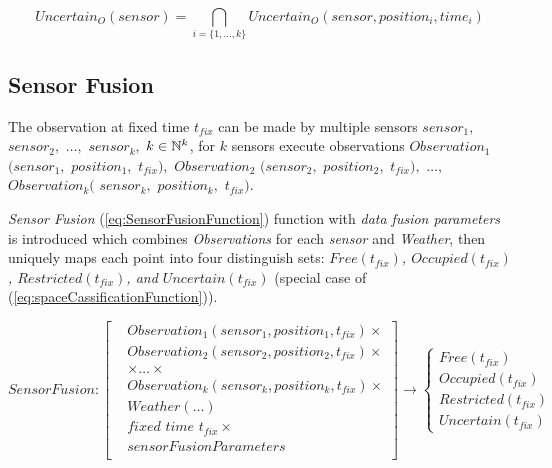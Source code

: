    \begin{equation}\label{eq:uncertainObservableSpaceForOneSensor}
         Uncertain_O(sensor)= \bigcap_{i=\{1,\dots,k\}}Uncertain_O(sensor,position_i,time_i)
    \end{equation}

\subsection{Sensor Fusion}\label{s:SensorFusionDefinition}
    \noindent The observation at fixed time $t_{fix}$ can be made by multiple sensors $sensor_1,$ $sensor_2,$ $\dots,$ $sensor_k,$ $k\in\mathbb{N}^k$, for $k$ sensors execute observations $Observation_1$ $(sensor_1,$ $position_1,$ $t_{fix}),$ $Observation_2$ $(sensor_2,$ $position_2,$ $t_{fix}),$ $\dots,$ $Observation_k($ $sensor_k,$ $position_k,$ $t_{fix})$. 

    \emph{Sensor Fusion} (\ref{eq:SensorFusionFunction}) function with \emph{data fusion parameters} is introduced which combines \emph{Observations} for each \emph{sensor} and \emph{Weather}, then  uniquely maps each point into four distinguish sets: \emph{$Free(t_{fix})$, $Occupied(t_{fix})$, $Restricted(t_{fix})$, and $Uncertain(t_{fix})$} (special case of (\ref{eq:spaceCassificationFunction})).

    \begin{equation}\label{eq:SensorFusionFunction}
        SensorFusion:
        \left[
        \begin{aligned}
            &Observation_1 (sensor_1, position_1, t_{fix})\times\\
            &Observation_2 (sensor_2, position_2, t_{fix})\times\\
            &\times\dots\times\\
            &Observation_k (sensor_k, position_k, t_{fix})\times\\
            &Weather(\dots)\\
            &\textit{fixed time }t_{fix}\times\\
            &sensorFusionParameters\\
        \end{aligned}
        \right]
        \to
        \begin{cases}
            Free(t_{fix})\\
            Occupied(t_{fix})\\
            Restricted(t_{fix})\\
            Uncertain(t_{fix})
        \end{cases}
    \end{equation}

